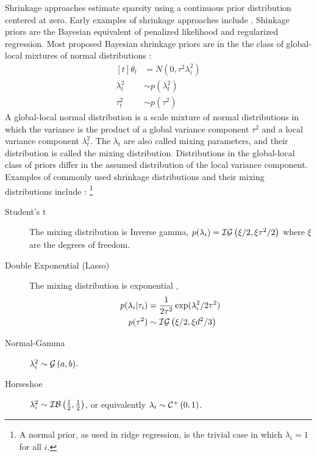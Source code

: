 \documentclass{article}
\begin{document}
Shrinkage approaches estimate sparsity using a continuous prior distribution centered at zero.
Early examples of shrinkage approaches include \parencites{Tibshirani1996}{Tipping2001}.
Shinkage priors are the Bayesian equivalent of penalized likelihood and regularized regression.
Most proposed Bayesian shrinkage priors are in the the class of global-local mixtures of normal distributions \parencite{PolsonScott2010}:
\begin{equation}
  \label{eq:3}
  \begin{aligned}[t]
    \theta_{t} &= N(0, \tau^{2} \lambda_{i}^{2}) \\ 
    \lambda_{t}^{2} &\sim p(\lambda_{t}^{2}) \\
    \tau_{t}^{2} &\sim p(\tau^{2})
  \end{aligned}
\end{equation}
A global-local normal distribution is a scale mixture of normal distributions in which the variance is the product of a global variance component $\tau^{2}$ and a local variance component $\lambda_{t}^{2}$.
The $\lambda_t$ are also called mixing parameters, and their distribution is called the mixing distribution.
Distributions in the global-local class of priors differ in the assumed distribution of the local variance component. 
Examples of commonly used shrinkage distributions and their mixing distributions include \parencite{PolsonScott2010}:%
\footnote{A normal prior, as used in ridge regression, is the trivial case in which $\lambda_{i} = 1$ for all $i$.}
\begin{description}
\item[Student's t] The mixing distribution is Inverse gamma, $p(\lambda_{i}) = \mathcal{IG}\left(\xi / 2, \xi \tau^{2} / 2\right)$ where $\xi$ are the degrees of freedom. \parencite{Tipping2001}
\item[Double Exponential (Lasso)] The mixing distribution is exponential \parencites{ParkCasella2008}{Hans2009},
\begin{equation*}
    \begin{aligned}[t]
      p(\lambda_{i} | \tau_{i}) &= \frac{1}{2 \tau^{2}} \exp (\lambda_{i}^{2} / 2 \tau^{2}) \\
      p(\tau^{2}) &\sim \mathcal{IG}\left(\xi / 2, \xi d^{2} / 3\right)
    \end{aligned}
  \end{equation*}
\item[Normal-Gamma] $\lambda^{2}_{i} \sim \mathcal{G}\left(a, b\right)$. \parencites{CaronDoucet2008}{BrownGriffin2010}
\item[Horseshoe] $\lambda^{2}_{i} \sim \mathcal{IB}\left(\frac{1}{2}, \frac{1}{2}\right)$, or equivalently $\lambda_{i} \sim \mathcal{C}^{+}\left(0, 1\right)$. \parencite{CarvalhoPolsonScott2010}
\end{description}
\end{document}
